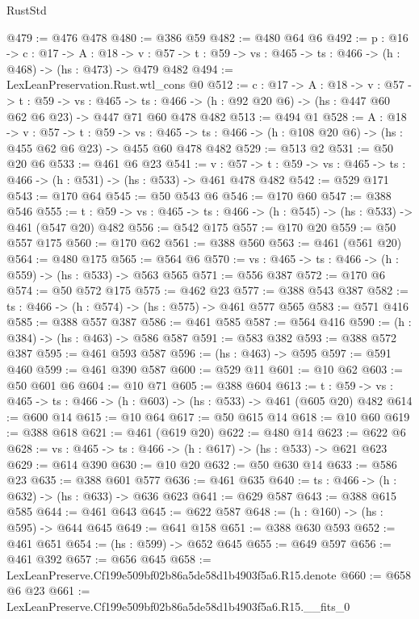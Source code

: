 \begin{lexlean}{RustStd}
\begin{coremodule}
@479 := @476 @478
@480 := @386 @59
@482 := @480 @64 @6
@492 := {p : @16} ->
  {c : @17} ->
  {A : @18} ->
  {v : @57} -> {t : @59} -> {vs : @465} -> {ts : @466} -> (h : @468) -> (hs : @473) -> @479 @482
@494 := LexLeanPreservation.Rust.wtl_cons @0
@512 := {c : @17} ->
  {A : @18} ->
  {v : @57} ->
  {t : @59} ->
  {vs : @465} ->
  {ts : @466} -> (h : @92 @20 @6) -> (hs : @447 @60 @62 @6 @23) -> @447 @71 @60 @478 @482
@513 := @494 @1
@528 := {A : @18} ->
  {v : @57} ->
  {t : @59} ->
  {vs : @465} -> {ts : @466} -> (h : @108 @20 @6) -> (hs : @455 @62 @6 @23) -> @455 @60 @478 @482
@529 := @513 @2
@531 := @50 @20 @6
@533 := @461 @6 @23
@541 := {v : @57} ->
  {t : @59} -> {vs : @465} -> {ts : @466} -> (h : @531) -> (hs : @533) -> @461 @478 @482
@542 := @529 @171
@543 := @170 @64
@545 := @50 @543 @6
@546 := @170 @60
@547 := @388 @546
@555 := {t : @59} -> {vs : @465} -> {ts : @466} -> (h : @545) -> (hs : @533) -> @461 (@547 @20) @482
@556 := @542 @175
@557 := @170 @20
@559 := @50 @557 @175
@560 := @170 @62
@561 := @388 @560
@563 := @461 (@561 @20)
@564 := @480 @175
@565 := @564 @6
@570 := {vs : @465} -> {ts : @466} -> (h : @559) -> (hs : @533) -> @563 @565
@571 := @556 @387
@572 := @170 @6
@574 := @50 @572 @175
@575 := @462 @23
@577 := @388 @543 @387
@582 := {ts : @466} -> (h : @574) -> (hs : @575) -> @461 @577 @565
@583 := @571 @416
@585 := @388 @557 @387
@586 := @461 @585
@587 := @564 @416
@590 := (h : @384) -> (hs : @463) -> @586 @587
@591 := @583 @382
@593 := @388 @572 @387
@595 := @461 @593 @587
@596 := (hs : @463) -> @595
@597 := @591 @460
@599 := @461 @390 @587
@600 := @529 @11
@601 := @10 @62
@603 := @50 @601 @6
@604 := @10 @71
@605 := @388 @604
@613 := {t : @59} -> {vs : @465} -> {ts : @466} -> (h : @603) -> (hs : @533) -> @461 (@605 @20) @482
@614 := @600 @14
@615 := @10 @64
@617 := @50 @615 @14
@618 := @10 @60
@619 := @388 @618
@621 := @461 (@619 @20)
@622 := @480 @14
@623 := @622 @6
@628 := {vs : @465} -> {ts : @466} -> (h : @617) -> (hs : @533) -> @621 @623
@629 := @614 @390
@630 := @10 @20
@632 := @50 @630 @14
@633 := @586 @23
@635 := @388 @601 @577
@636 := @461 @635
@640 := {ts : @466} -> (h : @632) -> (hs : @633) -> @636 @623
@641 := @629 @587
@643 := @388 @615 @585
@644 := @461 @643
@645 := @622 @587
@648 := (h : @160) -> (hs : @595) -> @644 @645
@649 := @641 @158
@651 := @388 @630 @593
@652 := @461 @651
@654 := (hs : @599) -> @652 @645
@655 := @649 @597
@656 := @461 @392
@657 := @656 @645
@658 := LexLeanPreserve.Cf199e509bf02b86a5de58d1b4903f5a6.R15.denote
@660 := @658 @6 @23
@661 := LexLeanPreserve.Cf199e509bf02b86a5de58d1b4903f5a6.R15.__fits_0

\end{coremodule}
\end{lexlean}
